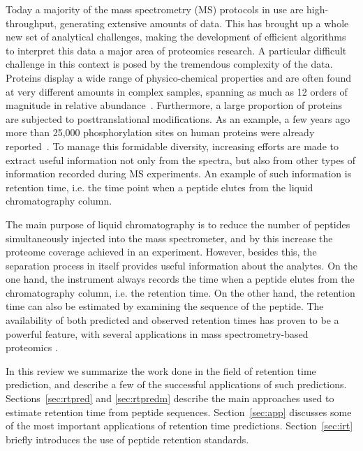 \documentclass[a4paper]{article}
\begin{document}
Today a majority of the mass spectrometry (MS) protocols in use are high-throughput, generating extensive amounts of data. This has brought up a whole new set of analytical challenges, making the development of efficient algorithms to interpret this data a major area of proteomics research. A particular difficult challenge in this context is posed by the tremendous complexity of the data. Proteins
display a wide range of physico-chemical properties and are often found at very different amounts in complex samples, spanning as much as 12 orders of magnitude in relative
abundance~\cite{Angel2012}. Furthermore, a large proportion of
proteins are subjected to posttranslational modifications. As an
example, a few years ago more than 25,000 phosphorylation sites on
human proteins were already reported~\cite{Lemeer2009}. To manage this formidable diversity,
 increasing efforts are made to extract useful information not only from the spectra, but also from other types of information recorded during MS experiments. An example of such information is retention time, i.e. the time point when a peptide elutes from the liquid chromatography column. 

\vspace{0.15cm}

The main purpose of liquid chromatography is to reduce the number of peptides
simultaneously injected into the mass spectrometer, and by this
increase the proteome coverage achieved in an experiment. However, besides this, the separation process in itself provides
useful information about the analytes. On the one hand, the instrument
always records the time when a peptide elutes from the chromatography
column, i.e. the retention time. On the other hand, the retention time
can also be estimated by examining the sequence of the peptide. The
availability of both predicted and observed retention times has proven
to be a powerful feature, with several applications in mass
spectrometry-based proteomics \cite{Palmblad2013}.  

\vspace{0.15cm}

In this review we summarize the work done in the field of retention time prediction, and describe a few of the successful applications of such predictions. 
Sections~\ref{sec:rtpred} and \ref{sec:rtpredm} describe the main
approaches used to estimate retention time from peptide sequences.
Section~\ref{sec:app} discusses some of the most important
applications of retention time predictions. Section~\ref{sec:irt}
briefly introduces the use of peptide retention standards.
\end{document}
